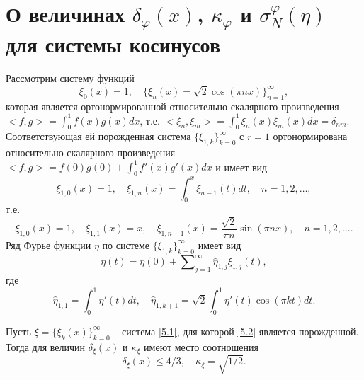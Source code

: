 \section{О величинах $\delta_\varphi(x)$, $\kappa_\varphi$ и $\sigma_N^\varphi(\eta)$ для системы косинусов }


Рассмотрим систему функций
\begin{equation}\label{5.1}
 \xi_0(x)=1,\quad \{\xi_n(x)=\sqrt{2}\cos(\pi nx)\}_{n=1}^\infty,
 \end{equation}
 которая является ортонормированной относительно скалярного произведения $<f,g>=\int_0^1f(x)g(x)dx$, т.е.
$
 <\xi_n,\xi_m>=\int_0^1\xi_n(x)\xi_m(x)dx=\delta_{nm}.
$
Соответствующая ей порожденная система $\{\xi_{1,k}\}_{k=0}^\infty$ с $r=1$ ортонормирована
относительно скалярного произведения $ <f,g>=f(0)g(0)+\int_0^1f'(x)g'(x)dx$
и имеет вид
$$
 \xi_{1,0}(x)=1,\quad \xi_{1,n}(x)=\int_0^x \xi_{n-1}(t)dt, \quad n=1,2,\ldots,
$$
т.е.
\begin{equation}\label{5.2}
 \xi_{1,0}(x)=1,\quad \xi_{1,1}(x)=x,\quad \xi_{1,n+1}(x)=\frac{\sqrt{2}}{\pi n}\sin(\pi nx),\quad n=1,2,\ldots.
\end{equation}
Ряд Фурье функции $\eta$ по системе $\{\xi_{1,k}\}_{k=0}^\infty$ имеет вид
 \begin{equation}\label{5.3}
 \eta(t)=\eta(0) +\sum\nolimits_{j=1}^\infty \hat \eta_{1,j}\xi_{1,j}(t),
\end{equation}
где
$$
\hat \eta_{1,1}=\int_{0}^1 \eta'(t)dt,\quad
\hat \eta_{1,k+1}=\sqrt{2}\int_{0}^1 \eta'(t)\cos(\pi kt)dt.
$$
\begin{theorem}
  Пусть $\xi=\{\xi_k(x)\}_{k=0}^\infty$ -- система  \eqref{5.1}, для которой  \eqref{5.2} является порожденной. Тогда для величин $\delta_{\xi}(x)$ и    $\kappa_\xi$  имеют место соотношения
 $$
\delta_{\xi}(x)\le 4/3,\quad\kappa_{\xi}=\sqrt{1/2}.
$$
\end{theorem}

